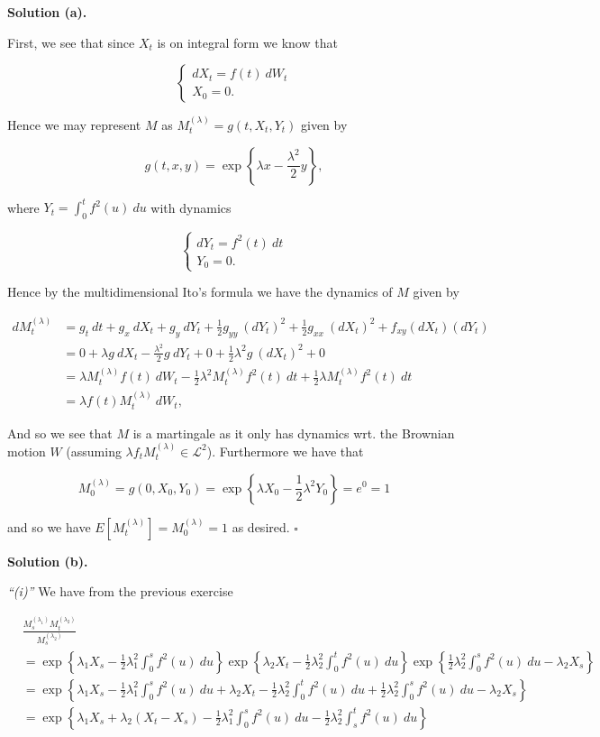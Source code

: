 \documentclass[
]{article}
\begin{document}
\textbf{Solution (a).}

First, we see that since \(X_t\) is on integral form we know that

\[
\begin{cases}
dX_t=f(t)\ dW_t\\
X_0=0.
\end{cases}
\]

Hence we may represent \(M\) as \(M^{(\lambda)}_t=g(t,X_t,Y_t)\) given
by

\[
g(t,x,y)=\exp\left\{\lambda x-\frac{\lambda^2}{2}y \right\},
\]

where \(Y_t=\int_0^t f^2(u)\ du\) with dynamics

\[
\begin{cases}
dY_t=f^2(t)\ dt\\
Y_0=0.
\end{cases}
\]

Hence by the multidimensional Ito's formula we have the dynamics of
\(M\) given by

\begin{align*}
dM^{(\lambda)}_t&=g_t\ dt+g_x\ dX_t+g_y\ dY_t+\frac{1}{2}g_{yy}\ (dY_t)^2+\frac{1}{2}g_{xx}\ (dX_t)^2 +f_{xy}(dX_t)(dY_t)\\
&=0+\lambda g\ dX_t-\frac{\lambda^2}{2}g\ dY_t+0+\frac{1}{2}\lambda ^2g\ (dX_t)^2+0\\
&=\lambda M_t^{(\lambda)} f(t)\ dW_t-\frac{1}{2}\lambda^2M_t^{(\lambda)} f^2(t)\ dt+\frac{1}{2}\lambda M_t^{(\lambda)} f^2(t)\ dt\\
&=\lambda f(t)M_t^{(\lambda)}\ dW_t,
\end{align*}

And so we see that \(M\) is a martingale as it only has dynamics wrt.
the Brownian motion \(W\) (assuming
\(\lambda f_tM_t^{(\lambda)}\in\mathcal{L}^2\)). Furthermore we have
that

\[
M_0^{(\lambda)}=g(0,X_0,Y_0)=\exp\left\{\lambda X_0-\frac{1}{2}\lambda ^2 Y_0\right\}=e^0=1
\]

and so we have \(E[M_t^{(\lambda)}]=M_0^{(\lambda)}=1\) as desired.
\(\square\)

\textbf{Solution (b).}

\emph{``(i)''} We have from the previous exercise

\begin{align*}
&\frac{M^{(\lambda_1)}_sM^{(\lambda_2)}_t}{M^{(\lambda_2)}_s}\\
&=\exp\left\{\lambda_1 X_s-\frac{1}{2}\lambda_1^2\int_0^s f^2(u)\ du\right\}\exp\left\{\lambda_2 X_t-\frac{1}{2}\lambda_2^2\int_0^t f^2(u)\ du\right\}\exp\left\{\frac{1}{2}\lambda_2^2\int_0^s f^2(u)\ du-\lambda_2 X_s\right\}\\
&=\exp\left\{\lambda_1 X_s-\frac{1}{2}\lambda_1^2\int_0^s f^2(u)\ du+\lambda_2 X_t-\frac{1}{2}\lambda_2^2\int_0^t f^2(u)\ du+\frac{1}{2}\lambda_2^2\int_0^s f^2(u)\ du-\lambda_2 X_s\right\}\\
&=\exp\left\{\lambda_1 X_s+\lambda_2 (X_t-X_s)-\frac{1}{2}\lambda_1^2\int_0^s f^2(u)\ du-\frac{1}{2}\lambda_2^2\int_s^t f^2(u)\ du\right\}
\end{align*}
\end{document}
